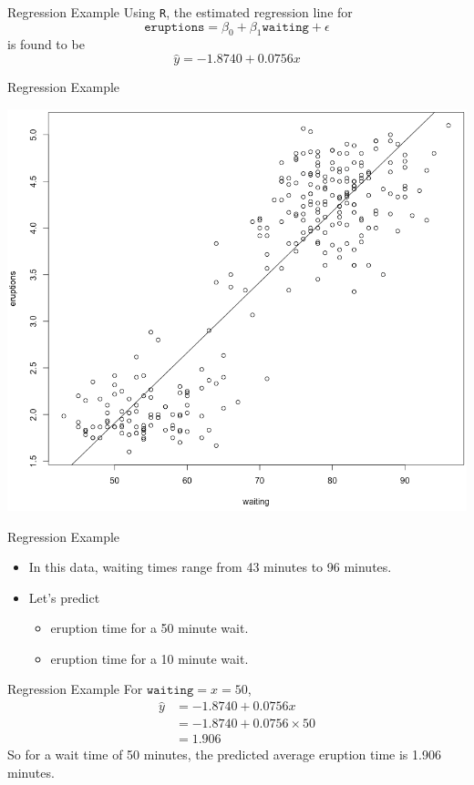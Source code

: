 \begin{frame}{Regression Example}
    Using \texttt{R}, the estimated regression line for
    \[
        \texttt{eruptions} = \beta_0 + \beta_1 \texttt{waiting} + \epsilon
    \]
    is found to be
    \[
        \hat{y} = -1.8740 + 0.0756 x
    \]
\end{frame}

\begin{frame}{Regression Example}
    \begin{center}
        \includegraphics[scale=0.25]{images/geysreg.png}
    \end{center}
\end{frame}

\begin{frame}{Regression Example}
    \begin{itemize}
        \item In this data, waiting times range from 43 minutes to 96 minutes. 
        \item Let's predict
        \begin{itemize}
            \item eruption time for a 50 minute wait.
            \item eruption time for a 10 minute wait.
        \end{itemize}
    \end{itemize}
\end{frame}

\begin{frame}{Regression Example}
    For $\texttt{waiting}=x=50$,
    \begin{align*}
        \hat{y} &= -1.8740 + 0.0756 x \\
        &= -1.8740 + 0.0756 \times 50 \\
        &= 1.906
    \end{align*}
    So for a wait time of 50 minutes, the predicted average eruption time is 1.906 minutes.
\end{frame}

